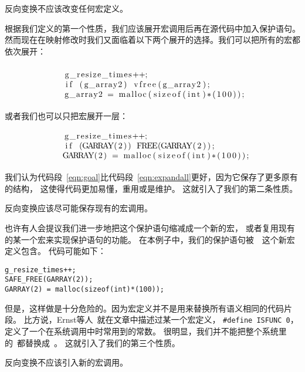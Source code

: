 \begin{decision}
反向变换不应该改变任何宏定义。
\end{decision}

根据我们定义的第一个性质，我们应该展开宏调用后再在源代码中加入保护语句。
然而现在在映射修改时我们又面临着以下两个展开的选择。我们可以把所有的宏都依次展开：

\begin{equation}
\begin{minipage}{7.6cm}
\begin{lstlisting}
g_resize_times++;
if (g_array2) vfree(g_array2);
g_array2 = malloc(sizeof(int)*(100));
\end{lstlisting}
\end{minipage}
\label{eqn:expandall}
\end{equation}
或者我们也可以只把宏展开一层：
\begin{equation}
\begin{minipage}{7.6cm}
\begin{lstlisting}
g_resize_times++;
if (GARRAY(2)) FREE(GARRAY(2));
GARRAY(2) = malloc(sizeof(int)*(100));
\end{lstlisting}
\end{minipage}
\label{eqn:goal}
\end{equation}
\newcommand{\coderef}[1]{code piece~(\ref{#1})}
我们认为代码段~\ref{eqn:goal}比代码段~\ref{eqn:expandall}更好，因为它保存了更多原有的结构，
这使得代码更加易懂，重用或是维护。
这就引入了我们的第二条性质。

\begin{decision}
反向变换应该尽可能保存现有的宏调用。
\end{decision}

也许有人会提议我们进一步地把这个保护语句缩减成一个新的宏，
或者复用现有的某一个宏来实现保护语句的功能。
在本例子中，我们的保护语句被~~这个新宏定义包含。
代码可能如下：
\begin{lstlisting}
g_resize_times++;
SAFE_FREE(GARRAY(2));
GARRAY(2) = malloc(sizeof(int)*(100));
\end{lstlisting}
但是，这样做是十分危险的。因为宏定义并不是用来替换所有语义相同的代码片段。
比方说，Ernst等人~\parencite{ernst2002empirical}就在文章中描述过某一个宏定义，
\lstinline!#define ISFUNC 0!， 定义了一个在系统调用中时常用到的常数。
很明显，我们并不能把整个系统里的~都替换成~。
这就引入了我们的第三个性质。

\begin{decision}
  反向变换不应该引入新的宏调用。
\end{decision}

